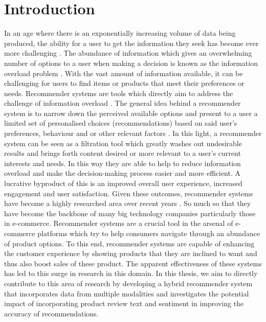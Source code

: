 
\chapter{Introduction} %
\label{Chapter1} %


\newcommand{\keyword}[1]{\textbf{#1}}
\newcommand{\tabhead}[1]{\textbf{#1}}
\newcommand{\code}[1]{\texttt{#1}}
\newcommand{\file}[1]{\texttt{\bfseries#1}}
\newcommand{\option}[1]{\texttt{\itshape#1}}


In an age where there is an exponentially increasing volume of data being produced, the ability for a user to get the information they seek has become ever more challenging \citep{sintef2013bigdata}. The abundance of information which gives an overwhelming number of options to a user when making a decision is known as the information overload problem \citep{bawden2020information}. With the vast amount of information available, it can be challenging for users to find items or products that meet their preferences or needs. Recommender systems are tools which directly aim to address the challenge of information overload \citep{o2005trust}. The general idea behind a recommender system is to narrow down the perceived available options and present to a user a limited set of personalised choices (recommendations) based on said user’s preferences, behaviour and or other relevant factors \citep{o2005trust}. In this light, a recommender system can be seen as a filtration tool which greatly washes out undesirable results and brings forth content desired or more relevant to a user’s current interests and needs. In this way they are able to help to reduce information overload and make the decision-making process easier and more efficient. A lucrative byproduct of this is an improved overall user experience, increased engagement and user satisfaction. Given these outcomes, recommender systems have become a highly researched area over recent years \citep{seth2022comparative}. So much so that they have become the backbone of many big technology companies particularly those in e-commerce. Recommender systems are a crucial tool in the arsenal of e-commerce platforms which try to help consumers navigate through an abundance of product options. To this end, recommender systems are capable of enhancing the customer experience by showing products that they are inclined to want and thus also boost sales of these product. The apparent effectiveness of these systems has led to this surge in research in this domain. In this thesis, we aim to directly contribute to this area of research by developing a hybrid recommender system that incorporates data from multiple modalities and investigates the potential impact of incorporating product review text and sentiment in improving the accuracy of recommendations. 

